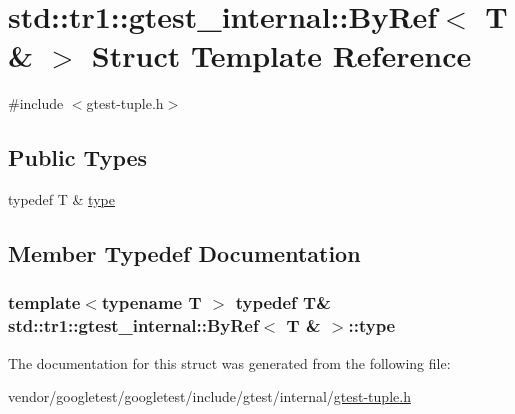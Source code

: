 \hypertarget{structstd_1_1tr1_1_1gtest__internal_1_1ByRef_3_01T_01_6_01_4}{}\section{std\+:\+:tr1\+:\+:gtest\+\_\+internal\+:\+:By\+Ref$<$ T \& $>$ Struct Template Reference}
\label{structstd_1_1tr1_1_1gtest__internal_1_1ByRef_3_01T_01_6_01_4}


{\ttfamily \#include $<$gtest-\/tuple.\+h$>$}

\subsection*{Public Types}
\begin{DoxyCompactItemize}
\item 
typedef T \& \hyperlink{structstd_1_1tr1_1_1gtest__internal_1_1ByRef_3_01T_01_6_01_4_a512382574dbdd736320d68e313801122}{type}
\end{DoxyCompactItemize}


\subsection{Member Typedef Documentation}
\subsubsection[{\texorpdfstring{type}{type}}]{\setlength{\rightskip}{0pt plus 5cm}template$<$typename T $>$ typedef T\& {\bf std\+::tr1\+::gtest\+\_\+internal\+::\+By\+Ref}$<$ T \& $>$\+::{\bf type}}\hypertarget{structstd_1_1tr1_1_1gtest__internal_1_1ByRef_3_01T_01_6_01_4_a512382574dbdd736320d68e313801122}{}\label{structstd_1_1tr1_1_1gtest__internal_1_1ByRef_3_01T_01_6_01_4_a512382574dbdd736320d68e313801122}


The documentation for this struct was generated from the following file\+:\begin{DoxyCompactItemize}
\item 
vendor/googletest/googletest/include/gtest/internal/\hyperlink{gtest-tuple_8h}{gtest-\/tuple.\+h}\end{DoxyCompactItemize}
